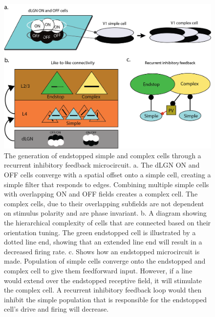 \documentclass[12pt]{article}
\begin{document}
\begin{figure}[H]
  \centering
  \includegraphics[width=1.0 \textwidth]{adjusted_figures/LIF_Overview_Receptive_Field_Methods.png}
  \caption{The generation of endstopped simple and complex cells through a recurrent inhibitory feedback microcircuit. a. The dLGN ON and OFF cells converge with a spatial offset onto a simple cell, creating a simple filter that responds to edges. Combining multiple simple cells with overlapping ON and OFF fields creates a complex cell. The complex cells, due to their overlapping subfields are not dependent on stimulus polarity and are phase invariant. b. A diagram showing the hierarchical complexity of cells that are connected based on their orientation tuning. The green endstopped cell is illustrated by a dotted line end, showing that an extended line end will result in a decreased firing rate. c. Shows how an endstopped microcircuit is made. Population of simple cells converge onto the endstopped and complex cell to give them feedforward input. However, if a line would extend over the endstopped receptive field, it will stimulate the complex cell. A recurrent inhibitory feedback loop would then inhibit the simple population that is responsible for the endstopped cell's drive and firing will decrease.}
  \label{fig:LIF_Overview}
\end{figure}
\end{document}
